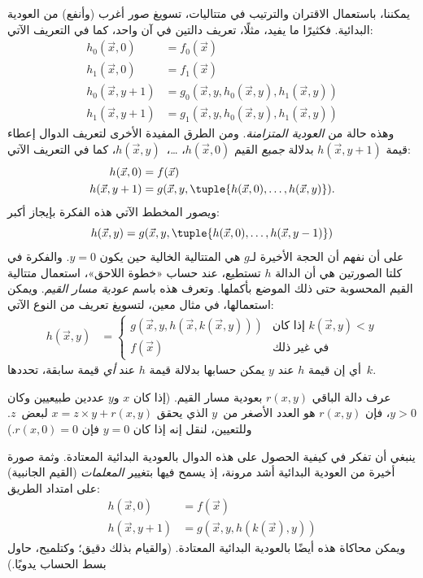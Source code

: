 \documentclass[../../../include/open-logic-section]{subfiles}
\begin{document}

يمكننا، باستعمال الاقتران والترتيب في متتاليات، تسويغ صور أغرب (وأنفع)
من العودية البدائية. فكثيرًا ما يفيد، مثلًا، تعريف دالتين في آن واحد،
كما في التعريف الآتي:
\begin{align*}
h_0(\vec x, 0) & = f_0(\vec x) \\
h_1(\vec x, 0) & = f_1(\vec x) \\
h_0(\vec x, y+1) & = g_0(\vec x, y, h_0(\vec x, y), h_1(\vec x, y)) \\
h_1(\vec x, y+1) & = g_1(\vec x, y, h_0(\vec x, y), h_1(\vec x, y))
\end{align*}
وهذه حالة من \emph{العودية المتزامنة}. ومن الطرق المفيدة الأخرى لتعريف
الدوال إعطاء قيمة $h(\vec x,y+1)$ بدلالة \emph{جميع} القيم
$h(\vec x,0)$، …،~$h(\vec x,y)$، كما في التعريف الآتي:
\begin{align*}
h(\vec x, 0) & = f(\vec x) \\
h(\vec x, y+1) & = g(\vec x, y, \tuple{h(\vec x, 0), \dots, h(\vec x, y)}).
\end{align*}
ويصور المخطط الآتي هذه الفكرة بإيجاز أكبر:
\[
h(\vec x, y) = g(\vec x, y, \tuple{h(\vec x, 0), \dots, h(\vec x, y-1)})
\]
على أن نفهم أن الحجة الأخيرة لـ$g$ هي المتتالية الخالية حين يكون
$y=0$. والفكرة في كلتا الصورتين هي أن الدالة $h$ تستطيع، عند حساب
«خطوة اللاحق»، استعمال متتالية القيم المحسوبة حتى ذلك الموضع بأكملها.
وتعرف هذه باسم \emph{عودية مسار القيم}. ويمكن استعمالها، في مثال
معين، لتسويغ تعريف من النوع الآتي:
\begin{align*}
h(\vec x, y) & = \begin{cases}
  g(\vec x, y, h(\vec x, k(\vec x, y))) & \text{إذا كان $k(\vec x, y) < y$} \\
  f(\vec x) & \text{في غير ذلك}
\end{cases}
\end{align*}
أي إن قيمة $h$ عند $y$ يمكن حسابها بدلالة قيمة $h$ عند
\emph{أي} قيمة سابقة، تحددها~$k$.

\begin{prob}
  عرف دالة الباقي $r(x,y)$ بعودية مسار القيم. (إذا كان $x$ و$y$
  عددين طبيعيين وكان $y>0$، فإن $r(x,y)$ هو العدد الأصغر من~$y$ الذي
  يحقق $x=z\times y+r(x,y)$ لبعض~$z$. وللتعيين، لنقل إنه إذا كان
  $y=0$ فإن $r(x,0)=0$.)
\end{prob}

ينبغي أن تفكر في كيفية الحصول على هذه الدوال بالعودية البدائية
المعتادة. وثمة صورة أخيرة من العودية البدائية أشد مرونة، إذ يسمح فيها
بتغيير \emph{المعلمات} (القيم الجانبية) على امتداد الطريق:
\begin{align*}
h(\vec x, 0) & = f(\vec x) \\
h(\vec x, y+1) & = g(\vec x, y, h(k(\vec x), y))
\end{align*}
ويمكن محاكاة هذه أيضًا بالعودية البدائية المعتادة. (والقيام بذلك دقيق؛
وكتلميح، حاول بسط الحساب يدويًا.)
\end{document}
